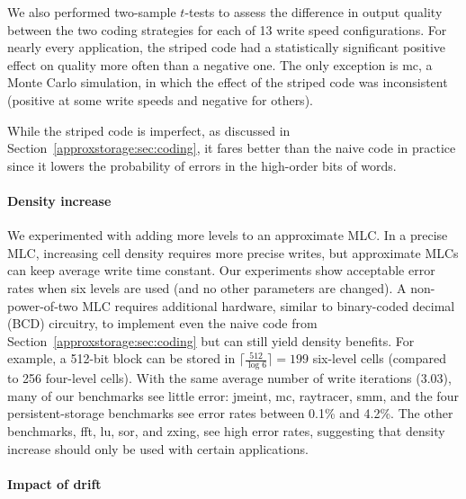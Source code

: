 We also
performed two-sample $t$-tests to assess the difference in output quality
between the two coding strategies for each of 13 write speed
configurations. For nearly every application, the striped code had a
statistically significant positive effect on quality more often than a
negative one. The only exception is \textsf{mc}, a Monte Carlo simulation, in
which the effect of the striped code was inconsistent (positive at some write
speeds and negative for others). 

While the striped code is imperfect, as
discussed in Section~\ref{approxstorage:sec:coding}, it fares better than the naive code in
practice since it lowers the probability of errors in the high-order bits of
words.


\paragraph{Density increase}

We experimented with adding more levels to an approximate MLC.
In a precise MLC, increasing
cell density requires more precise writes, but
approximate MLCs
can keep average write time
constant.
Our experiments show acceptable error rates when six levels are used (and no
other parameters are changed).
A non-power-of-two MLC requires additional hardware,
similar to binary-coded decimal (BCD) circuitry, to implement even the naive
code from Section~\ref{approxstorage:sec:coding} but can
still yield density benefits. For example, a 512-bit block can be stored in
$\lceil \frac{512}{\log 6} \rceil = 199$
six-level cells (compared to 256 four-level cells). With the same average number of
write iterations (3.03), many of our benchmarks
see little error: \textsf{jmeint}, \textsf{mc}, \textsf{raytracer},
\textsf{smm}, and the four persistent-storage benchmarks see error rates between
0.1\% and 4.2\%.
The other benchmarks, \textsf{fft}, \textsf{lu},
\textsf{sor}, and \textsf{zxing}, see high error rates, suggesting that
density increase should only be used with certain applications.

\paragraph{Impact of drift}

